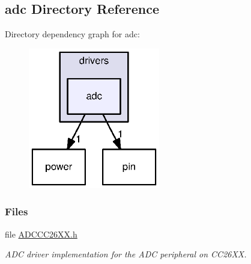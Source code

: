 \subsection{adc Directory Reference}
\label{dir_f736fba9a6bf932b5f787110404c672f}
Directory dependency graph for adc\+:
\nopagebreak
\begin{figure}[H]
\begin{center}
\leavevmode
\includegraphics[width=163pt]{dir_f736fba9a6bf932b5f787110404c672f_dep}
\end{center}
\end{figure}
\subsubsection*{Files}
\begin{DoxyCompactItemize}
\item 
file \hyperlink{_a_d_c_c_c26_x_x_8h}{A\+D\+C\+C\+C26\+X\+X.\+h}
\begin{DoxyCompactList}\small\item\em A\+D\+C driver implementation for the A\+D\+C peripheral on C\+C26\+X\+X. \end{DoxyCompactList}\end{DoxyCompactItemize}
